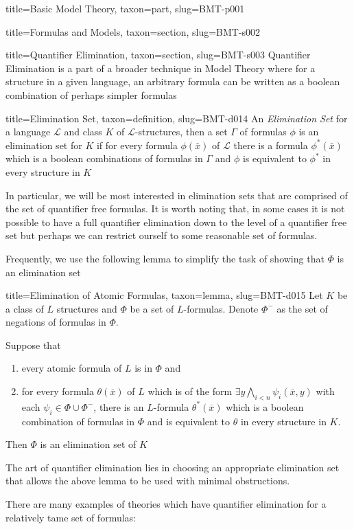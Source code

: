 \documentclass[a4paper]{article}
\begin{document}
\begin{tree}{title={Basic Model Theory}, taxon={part}, slug={BMT-p001}}
\begin{tree}{title={Formulas and Models}, taxon={section}, slug={BMT-s002}}
\end{tree}


  
  
\begin{tree}{title={Quantifier Elimination}, taxon={section}, slug={BMT-s003}}
Quantifier Elimination is a part of a broader technique in Model Theory where for a structure in a given language, an arbitrary formula can be written as a boolean combination of perhaps simpler formulas
\begin{tree}{title={Elimination Set}, taxon={definition}, slug={BMT-d014}}
An \emph{Elimination Set} for a language \(\mathcal {L}\) and class \(K\) of \(\mathcal {L}\)-structures, then a set \(\Gamma\) of formulas \(\phi\) is an elimination set for \(K\) if for every formula \(\phi ( \bar {x})\) of \(\mathcal {L}\) there is a formula \(\phi ^*( \bar {x})\) which is a boolean combinations of formulas in \(\Gamma\) and \(\phi\) is equivalent to \(\phi ^*\) in every structure in \(K\)
\end{tree}
\par{In particular, we will be most interested in elimination sets that are comprised of the set of quantifier free formulas. It is worth noting that, in some cases it is not possible to have a full quantifier elimination down to the level of a quantifier free set but perhaps we can restrict ourself to some reasonable set of formulas.}\par{Frequently, we use the following lemma to simplify the task of showing that \(\Phi\) is an elimination set}
\begin{tree}{title={Elimination of Atomic Formulas}, taxon={lemma}, slug={BMT-d015}}
Let \(K\) be a class of \(L\) structures and \(\Phi\) be a set of \(L\)-formulas. Denote \(\Phi ^-\) as the set of negations of formulas in \(\Phi\).\par{Suppose that 
  \begin{enumerate}
\item{every atomic formula of \(L\) is in \(\Phi\) and} 
    \item{for every formula \(\theta ( \overline {x})\) of \(L\) which is of the form \(\exists  y  \bigwedge _{i<n}  \psi _i ( \overline {x},y)\) with each \(\psi _i  \in   \Phi \cup   \Phi ^-\), there is an \(L\)-formula \(\theta ^*( \overline {x})\) which is a boolean combination of formulas in \(\Phi\) and is equivalent to \(\theta\) in every structure in \(K\).}
\end{enumerate}
  Then \(\Phi\) is an elimination set of \(K\)}
\end{tree}
\par{The art of quantifier elimination lies in choosing an appropriate elimination set that allows the above lemma to be used with minimal obstructions. }\par{There are many examples of theories which have quantifier elimination for a relatively tame set of formulas: }
  

\end{tree}
\end{tree}
\end{document}

